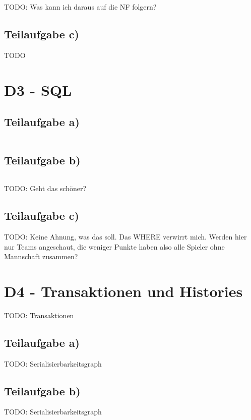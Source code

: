 \documentclass[a4paper,9pt]{scrartcl}
\begin{document}
TODO: Was kann ich daraus auf die NF folgern?

\subsection{Teilaufgabe c)}
TODO
\clearpage

\section{D3 - SQL}
\subsection{Teilaufgabe a)}
\inputminted[linenos, numbersep=5pt, tabsize=4]{sql}{d3a.sql}

\subsection{Teilaufgabe b)}
\inputminted[linenos, numbersep=5pt, tabsize=4]{sql}{d3b.sql}

TODO: Geht das schöner?

\subsection{Teilaufgabe c)}
TODO: Keine Ahnung, was das soll. Das WHERE verwirrt mich. Werden hier
nur Teams angeschaut, die weniger Punkte haben also alle Spieler ohne 
Mannschaft zusammen?

\section{D4 - Transaktionen und Histories}
TODO: Transaktionen
\subsection{Teilaufgabe a)}
TODO: Serialisierbarkeitsgraph

\subsection{Teilaufgabe b)}
TODO: Serialisierbarkeitsgraph
\end{document}

